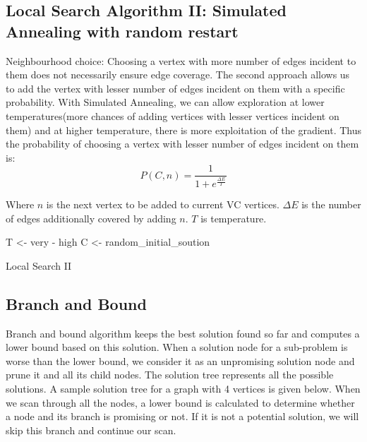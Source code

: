 \subsection{Local Search Algorithm II: Simulated Annealing with random restart}
Neighbourhood choice: Choosing a vertex with more number of edges incident to them does not necessarily ensure edge coverage. The second approach allows us to add the vertex with lesser number of edges incident on them with a specific probability. With Simulated Annealing, we can allow exploration at lower temperatures(more chances of adding vertices with lesser vertices incident on them) and at higher temperature, there is more exploitation of the gradient. Thus the probability of choosing a vertex with lesser number of edges incident on them is:
\begin{equation}
P\left( C,n \right)=\frac{1}{1+{{e}^{\frac{\Delta E}{T}}}}
\end{equation}

Where $n$ is the next vertex to be added to current VC vertices. $\Delta E$ is the number of edges additionally covered by adding $n$. $T$ is temperature.

\begin{algorithm}[ht]
\SetAlgoNoLine
T <- very - high\;
C <- random\_initial\_soution\;
\caption{Local Search II}
\end{algorithm}
\subsection{Branch and Bound}
Branch and bound algorithm keeps the best solution found so far and computes a lower bound based on this solution. When a solution node for a sub-problem is worse than the lower bound, we consider it as an unpromising solution node and prune it and all its child nodes. The solution tree represents all the possible solutions. A sample solution tree for a graph with 4 vertices is given below. When we scan through all the nodes, a lower bound is calculated to determine whether a node and its branch is promising or not. If it is not a potential solution, we will skip this branch and continue our scan.

